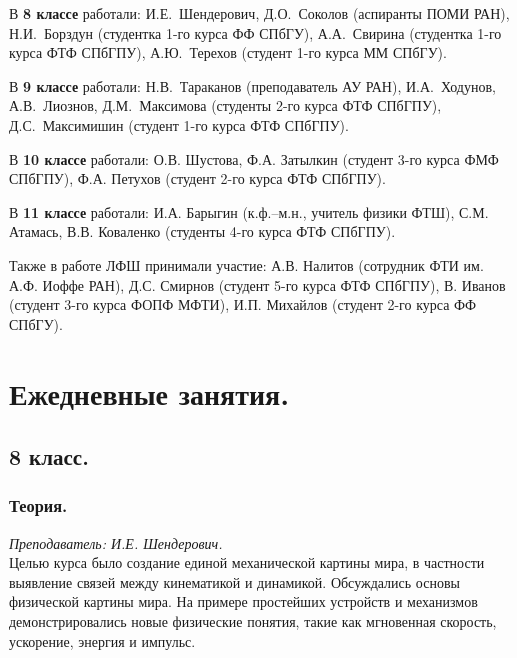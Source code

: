 \documentclass[12pt]{article}
\newlength{\h}
\newlength{\x}
\begin{document}
В \textbf{8 классе} работали: И.Е.~Шендерович, Д.О.~Соколов (аспиранты
ПОМИ РАН), Н.И.~Борздун (студентка 1-го курса ФФ СПбГУ), А.А.~Свирина
(студентка 1-го курса ФТФ СПбГПУ), А.Ю.~Терехов (студент 1-го курса ММ СПбГУ).

В \textbf{9 классе} работали: Н.В.~Тараканов (преподаватель АУ РАН),
И.А.~Ходунов, А.В.~Лиознов, Д.М.~Максимова (студенты 2-го курса ФТФ
СПбГПУ), Д.С.~Максимишин (студент 1-го курса ФТФ СПбГПУ). 

В \textbf{10 классе} работали: О.В. Шустова, Ф.А. Затылкин (студент 3-го
курса ФМФ СПбГПУ), Ф.А. Петухов (студент 2-го курса ФТФ СПбГПУ). 

В \textbf{11 классе} работали: И.А. Барыгин (к.ф.--м.н., учитель
физики ФТШ), С.М. Атамась, В.В. Коваленко (студенты 4-го курса ФТФ
СПбГПУ).

Также в работе ЛФШ принимали участие: А.В. Налитов (сотрудник ФТИ
им. А.Ф. Иоффе РАН), Д.С. Смирнов (студент 5-го курса ФТФ СПбГПУ),
В. Иванов (студент 3-го курса ФОПФ МФТИ), И.П. Михайлов (студент 2-го
курса ФФ СПбГУ).

\clearpage

\section{Ежедневные занятия.}
\label{sec:daily}

\subsection{8 класс. }
\label{sec:daily8}

\subsubsection{Теория.}
\label{sec:daily8th}

\textit{Преподаватель: И.Е. Шендерович.}\\

Целью курса было создание единой механической картины мира, в
частности выявление связей между кинематикой и динамикой. Обсуждались
основы физической картины мира. На примере простейших устройств и
механизмов демонстрировались новые физические понятия, такие как
мгновенная скорость, ускорение, энергия и импульс.
\end{document}
